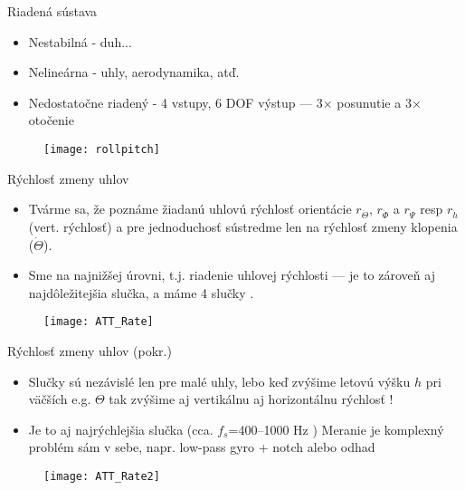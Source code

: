 \begin{frame}{Riadená sústava}
\begin{itemize}
  \item<1-> Nestabilná  - duh...
  \item<2-> Nelineárna  - uhly, aerodynamika, atď.
  \item<3-> Nedostatočne riadený  - 4 vstupy, 6 DOF výstup --- 3$\times$ posunutie a 3$\times$ otočenie \citep{Douglas2018}
\end{itemize}
\begin{figure}
\centering
  \texttt{[image: rollpitch]}\\
\end{figure}
\end{frame}

\begin{frame}[t]{Rýchlosť zmeny uhlov}
\begin{itemize}
  \item<1-> Tvárme sa, že poznáme žiadanú uhlovú rýchlosť orientácie $r_{\dot{\Theta}}$, $r_{\dot{\Phi}}$ a $r_{\dot{\Psi}}$ resp $r_{\dot{h}}$ (vert. rýchlosť) a pre jednoduchosť sústredme len na rýchlosť zmeny klopenia ($\dot{\Theta}$).
  \item<2-> Sme na najnižšej úrovni, t.j. riadenie uhlovej rýchlosti  --- je to zároveň aj najdôležitejšia slučka, a máme 4 slučky \citep{AP:PID,PX4:PIDTuning}.
  \end{itemize}

  \begin{figure}
\centering
  \texttt{[image: ATT\_Rate]}\\
\end{figure}
  \end{frame}


\begin{frame}[t]{Rýchlosť zmeny uhlov (pokr.)}
\begin{itemize}
  \item<1-> Slučky sú nezávislé len pre malé uhly, lebo keď zvýšime letovú výšku $h$ pri väčších e.g. $\Theta$ tak zvýšime aj vertikálnu aj horizontálnu rýchlosť \citep{Douglas2018}!
  \item<2->  Je to aj najrýchlejšia slučka (cca. $f_s$=400--1000 Hz \citep{AP:PID,PX4:PIDTuning}) Meranie je komplexný problém sám v sebe, napr. low-pass gyro + notch \citep{Bresciani2020} alebo odhad
  \end{itemize}
  \begin{figure}
\centering
  \texttt{[image: ATT\_Rate2]}\\
\end{figure}
  \end{frame}


